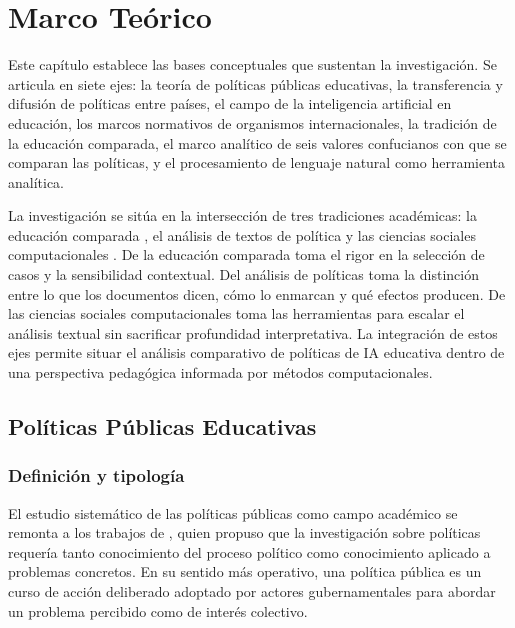 
\chapter{Marco Teórico}
\label{cap:marco-teorico}

Este capítulo establece las bases conceptuales que sustentan la investigación. Se articula en siete ejes: la teoría de políticas públicas educativas, la transferencia y difusión de políticas entre países, el campo de la inteligencia artificial en educación, los marcos normativos de organismos internacionales, la tradición de la educación comparada, el marco analítico de seis valores confucianos con que se comparan las políticas, y el procesamiento de lenguaje natural como herramienta analítica.

La investigación se sitúa en la intersección de tres tradiciones académicas: la educación comparada \citep{bray1995levels}, el análisis de textos de política \citep{rizvi2010globalizing} y las ciencias sociales computacionales \citep{grimmer2022text}. De la educación comparada toma el rigor en la selección de casos y la sensibilidad contextual. Del análisis de políticas toma la distinción entre lo que los documentos dicen, cómo lo enmarcan y qué efectos producen. De las ciencias sociales computacionales toma las herramientas para escalar el análisis textual sin sacrificar profundidad interpretativa. La integración de estos ejes permite situar el análisis comparativo de políticas de IA educativa dentro de una perspectiva pedagógica informada por métodos computacionales.


\section{Políticas Públicas Educativas}
\label{sec:politicas-publicas}

\subsection{Definición y tipología}

El estudio sistemático de las políticas públicas como campo académico se remonta a los trabajos de \citet{lasswell1951policy}, quien propuso que la investigación sobre políticas requería tanto conocimiento del proceso político como conocimiento aplicado a problemas concretos. En su sentido más operativo, una política pública es un curso de acción deliberado adoptado por actores gubernamentales para abordar un problema percibido como de interés colectivo.


